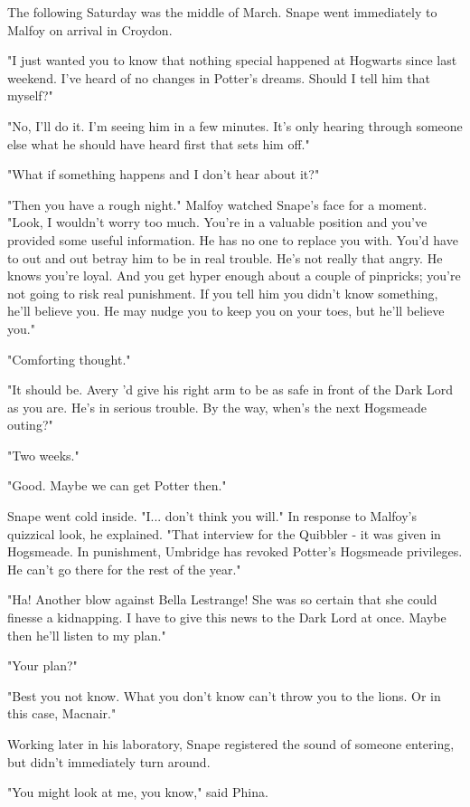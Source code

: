 The following Saturday was the middle of March. Snape went immediately to Malfoy on arrival in Croydon.

"I just wanted you to know that nothing special happened at Hogwarts since last weekend. I've heard of no changes in Potter's dreams. Should I tell him that myself?"

"No, I'll do it. I'm seeing him in a few minutes. It's only hearing through someone else what he should have heard first that sets him off."

"What if something happens and I don't hear about it?"

"Then you have a rough night." Malfoy watched Snape's face for a moment. "Look, I wouldn't worry too much. You're in a valuable position and you've provided some useful information. He has no one to replace you with. You'd have to out and out betray him to be in real trouble. He's not really that angry. He knows you're loyal. And you get hyper enough about a couple of pinpricks; you're not going to risk real punishment. If you tell him you didn't know something, he'll believe you. He may nudge you to keep you on your toes, but he'll believe you."

"Comforting thought."

"It should be. Avery 'd give his right arm to be as safe in front of the Dark Lord as you are. He's in serious trouble. By the way, when's the next Hogsmeade outing?"

"Two weeks."

"Good. Maybe we can get Potter then."

Snape went cold inside. "I... don't think you will." In response to Malfoy's quizzical look, he explained. "That interview for the Quibbler - it was given in Hogsmeade. In punishment, Umbridge has revoked Potter's Hogsmeade privileges. He can't go there for the rest of the year."

"Ha! Another blow against Bella Lestrange! She was so certain that she could finesse a kidnapping. I have to give this news to the Dark Lord at once. Maybe then he'll listen to my plan."

"Your plan?"

"Best you not know. What you don't know can't throw you to the lions. Or in this case, Macnair."

Working later in his laboratory, Snape registered the sound of someone entering, but didn't immediately turn around.

"You might look at me, you know," said Phina.

